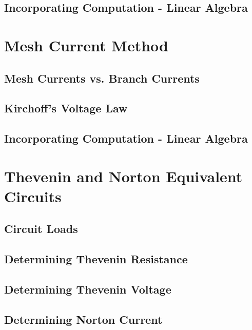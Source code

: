 \documentclass[a4paper,11pt]{book}
\begin{document}
\section{Incorporating Computation - Linear Algebra}
\chapter{Mesh Current Method}
\section{Mesh Currents vs. Branch Currents}
\section{Kirchoff's Voltage Law}
\section{Incorporating Computation - Linear Algebra}
\chapter{Thevenin and Norton Equivalent Circuits}
\section{Circuit Loads}
\section{Determining Thevenin Resistance}
\section{Determining Thevenin Voltage}
\section{Determining Norton Current}
\end{document}

